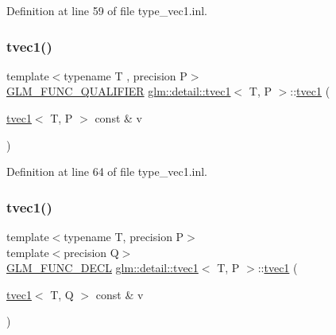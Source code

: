 Definition at line 59 of file type\+\_\+vec1.\+inl.

\mbox{\label{structglm_1_1detail_1_1tvec1_a5c5c89fea0163e5ad580d6b66347c726}} 
\subsubsection{\texorpdfstring{tvec1()}{tvec1()}\hspace{0.1cm}{\footnotesize\ttfamily [2/14]}}
{\footnotesize\ttfamily template$<$typename T , precision P$>$ \\
\hyperlink{setup_8hpp_a33fdea6f91c5f834105f7415e2a64407}{G\+L\+M\+\_\+\+F\+U\+N\+C\+\_\+\+Q\+U\+A\+L\+I\+F\+I\+ER} \hyperlink{structglm_1_1detail_1_1tvec1}{glm\+::detail\+::tvec1}$<$ T, P $>$\+::\hyperlink{structglm_1_1detail_1_1tvec1}{tvec1} (\begin{DoxyParamCaption}\item[{\hyperlink{structglm_1_1detail_1_1tvec1}{tvec1}$<$ T, P $>$ const \&}]{v }\end{DoxyParamCaption})}



Definition at line 64 of file type\+\_\+vec1.\+inl.

\mbox{\label{structglm_1_1detail_1_1tvec1_ae1002300caf6841b5a2effd442691db1}} 
\subsubsection{\texorpdfstring{tvec1()}{tvec1()}\hspace{0.1cm}{\footnotesize\ttfamily [3/14]}}
{\footnotesize\ttfamily template$<$typename T, precision P$>$ \\
template$<$precision Q$>$ \\
\hyperlink{setup_8hpp_ab2d052de21a70539923e9bcbf6e83a51}{G\+L\+M\+\_\+\+F\+U\+N\+C\+\_\+\+D\+E\+CL} \hyperlink{structglm_1_1detail_1_1tvec1}{glm\+::detail\+::tvec1}$<$ T, P $>$\+::\hyperlink{structglm_1_1detail_1_1tvec1}{tvec1} (\begin{DoxyParamCaption}\item[{\hyperlink{structglm_1_1detail_1_1tvec1}{tvec1}$<$ T, Q $>$ const \&}]{v }\end{DoxyParamCaption})}

